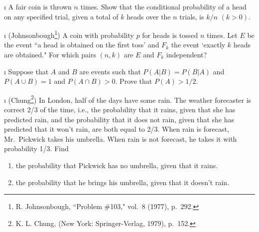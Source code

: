 \begin{LJSItem}
\i\label{exer 4.1.22} A fair coin is thrown $n$ times.  Show that the conditional probability
of a head on any specified trial, given a total of $k$ heads over the $n$
trials, is $k/n$ $(k > 0)$.

\i\label{exer 4.1.23} (Johnsonbough\footnote{R. Johnsonbough, ``Problem
\#103,"  vol.~8 (1977), p.~292.})  A coin with probability
$p$ for heads is tossed $n$ times.  Let $E$ be the event ``a head is obtained on the
first toss' and $F_k$ the event `exactly $k$ heads are obtained."  For which
pairs $(n,k)$ are $E$ and $F_k$ independent?

\i\label{exer 4.1.24} Suppose that $A$ and $B$ are events such that $P(A|B) = P(B|A)$ and $P(A
\cup B) = 1$ and $P(A \cap B) > 0$.  Prove that $P(A) > 1/2$.

\i\label{exer 4.1.25} (Chung\footnote{K. L. Chung,  (New York:  Springer-Verlag, 1979), p.~152.})
In London, half of the days have some rain.  The weather forecaster is correct 2/3 of the time,
i.e., the probability that it rains, given that she has predicted rain, and the probability that it
does not rain, given that she has predicted that it won't rain, are both equal to 2/3.  When rain is
forecast, Mr.\ Pickwick takes his umbrella.  When rain is not forecast, he
takes it with probability 1/3.  Find
\begin{enumerate}
\item the probability that Pickwick has no umbrella, given that it rains.

\item the probability that he brings his umbrella, given that it doesn't rain.
\end{enumerate}


\end{LJSItem}
